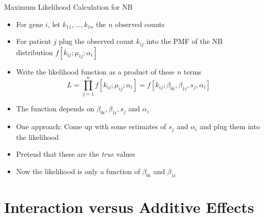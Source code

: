 \documentclass[xcolor=x11names,compress]{beamer}\usepackage[]{graphicx}\usepackage[]{color}
\begin{document}
\begin{frame}[fragile]{Maximum Likelihood Calculation for NB}
  \begin{itemize}
  \item For gene $i$, let $k_{11},\ldots,k_{1n}$ the $n$ observed counts
  \item For patient $j$ plug the observed count $k_{ij}$ into the PMF of
  the NB distribution $f[k_{ij};\mu_{ij};\alpha_i]$
  \item Write the likelihood function as a product of these $n$ terms
    \begin{equation*}
      L=\prod_{j=1}^n f[k_{ij};\mu_{ij};\alpha_i]=f[k_{ij};\beta_{0i}, \beta_{1i}, s_j, \alpha_i]
    \end{equation*}
  \item The function depends on $\beta_{0i}, \beta_{1i}, s_j$ and $\alpha_i$
  \item One approach: Come up with some estimates of $s_j$ and $\alpha_i$ and
    plug them into the likelihood
  \item Pretend that these are the {\it true} values
  \item Now the likelihood is only a function of $\beta_{0i}$ and $\beta_{1i}$
  \end{itemize}
\end{frame}









\section[Interaction]{Interaction versus Additive Effects}
\end{document}
